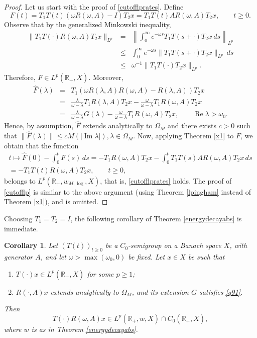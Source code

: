 \documentclass[11pt]{amsart}
\newtheorem{corollary}[theorem]{Corollary}
\theoremstyle{definition}
\theoremstyle{remark}
\numberwithin{equation}{section}
\begin{document}
\begin{proof}
Let us start with the proof of \eqref{cutofflprates}.
Define
\begin{equation*}
F(t)=T_1T(t)(\omega R(\omega, A) - I)T_2x=T_1T(t)A R(\omega, A)T_2x, \qquad t \ge 0.
\end{equation*}
Observe that by the generalized Minkowski inequality,
\begin{eqnarray*}
\|T_1 T(\cdot) R(\omega, A)T_2 x\|_{L^p} &=& \left \| \int_{0}^{\infty}e^{-\omega s}T_1T(s+\cdot)T_2x \, ds \right \|_{L^p}\\
&\le& \int_{0}^{\infty}e^{-\omega s}\| T_1T(s+\cdot)T_2x\|_{L^p} \, ds\\
&\le& \omega^{-1} \|T_1T(\cdot)T_2x\|_{L^p}.
\end{eqnarray*}
Therefore, $F \in L^p(\mathbb R_+, X)$.
Moreover,
\begin{eqnarray*}
\widehat F(\lambda)&=&T_1(\omega R(\lambda, A)R(\omega, A)-R(\lambda, A))T_2x \\
&=&\frac{\lambda}{\omega-\lambda}T_1R(\lambda, A)T_2x - \frac{\omega}{\omega-\lambda} T_1R(\omega, A)T_2x \\
&=&\frac{\lambda}{\omega-\lambda}G(\lambda)-\frac{\omega}{\omega-\lambda}T_1R(\omega, A)T_2x, \qquad {\operatorname{Re}}\lambda > \omega_0.
\end{eqnarray*}
Hence, by assumption, $\widehat F$ extends analytically to $\Omega_M$ and there exists $c >0$
such that $\|\widehat F(\lambda)\| \le c M(|{\operatorname{Im}} \lambda|), \lambda \in \Omega_M$.
Now, applying Theorem \ref{x1} to $F$, we obtain that the function
\begin{multline*}
t \mapsto \widehat F(0) -\int_{0}^{t} F(s)\, ds= - T_1R(\omega,A)T_2x -\int_{0}^{t}T_1T(s)A R(\omega, A)T_2x \, ds\\
=-T_1T(t)R(\omega, A)T_2x, \qquad t\ge 0,
\end{multline*}
belongs to $L^p (\mathbb R_+, {w_{M,{\log}}}, X)$, that is, \eqref{cutofflprates} holds.
The proof of \eqref{cutofflp} is similar to the above argument (using Theorem \ref{lpingham} instead of Theorem \ref{x1}), and is omitted.
\end{proof}

Choosing $T_1 = T_2 = I$, 
the following corollary of Theorem \ref{energydecayabs} is immediate.

\begin{corollary}\label{energyindiv}
Let $(T(t))_{t \ge 0}$ be a $C_0$-semigroup on a Banach space $X$, with generator $A$, and let $\omega >\max(\omega_0,0)$ be fixed.
Let $x \in X$ be such that
\begin{enumerate}[\rm(i)]
\item $T(\cdot)x \in L^p (\mathbb R_+, X)$ for some $p \ge 1$;
\item $R(\cdot, A)x$ extends analytically to $\Omega_M$,
and its extension $G$ satisfies \eqref{q91}.
\end{enumerate}
Then
 \begin{equation*}
 T(\cdot)R(\omega,A) x \in L^p (\mathbb R_+, w, X)\cap C_0(\mathbb R_+,X),
 \end{equation*}
 where $w$ is as in Theorem \ref{energydecayabs}.
\end{corollary}
\end{document}
